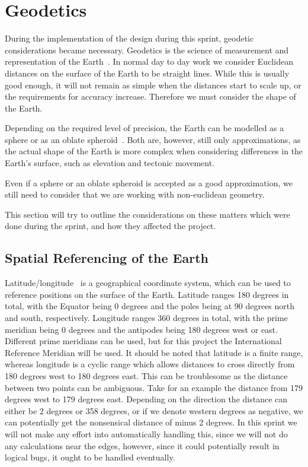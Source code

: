 \section{Geodetics}

During the implementation of the design during this sprint, geodetic considerations became necessary. Geodetics is the science of measurement and representation of the Earth~\cite{website:Wikipedia-geodesy}. In normal day to day work we consider Euclidean distances on the surface of the Earth to be straight lines. While this is usually good enough, it will not remain as simple when the distances start to scale up, or the requirements for accuracy increase. Therefore we must consider the shape of the Earth.

Depending on the required level of precision, the Earth can be modelled as a sphere or as an oblate spheroid~\cite{united1983geodesy}. Both are, however, still only approximations, as the actual shape of the Earth is more complex when considering differences in the Earth's surface, such as elevation and tectonic movement.

Even if a sphere or an oblate spheroid is accepted as a good approximation, we still need to consider that we are working with non-euclidean geometry.

This section will try to outline the considerations on these matters which were done during the sprint, and how they affected the project.

\subsection{Spatial Referencing of the Earth}

Latitude/longitude~\cite{WGS84} is a geographical coordinate system, which can be used to reference positions on the surface of the Earth. Latitude ranges 180 degrees in total, with the Equator being 0 degrees and the poles being at 90 degrees north and south, respectively. Longitude ranges 360 degrees in total, with the prime meridian being 0 degrees and the antipodes being 180 degrees west or east. Different prime meridians can be used, but for this project the International Reference Meridian will be used. It should be noted that latitude is a finite range, whereas longitude is a cyclic range which allows distances to cross directly from 180 degrees west to 180 degrees east. This can be troublesome as the distance between two points can be ambiguous. Take for an example the distance from 179 degrees west to 179 degrees east. Depending on the direction the distance can either be 2 degrees or 358 degrees, or if we denote western degrees as negative, we can potentially get the nonsensical distance of minus 2 degrees. In this sprint we will not make any effort into automatically handling this, since we will not do any calculations near the edges, however, since it could potentially result in logical bugs, it ought to be handled eventually.

